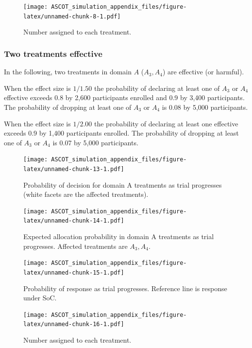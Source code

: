 \documentclass[
]{article}
\begin{document}
\begin{figure}
\centering
\texttt{[image: ASCOT\_simulation\_appendix\_files/figure-latex/unnamed-chunk-8-1.pdf]}
\caption{\label{fig:unnamed-chunk-8}Number assigned to each treatment.}
\end{figure}

\clearpage

\hypertarget{two-treatments-effective}{%
\subsubsection{Two treatments effective}\label{two-treatments-effective}}

In the following, two treatments in domain \(A\) (\(A_3, A_4\)) are effective (or harmful).

When the effect size is \(1/1.50\) the probability of declaring at least one of \(A_3\) or \(A_4\) effective exceeds 0.8 by 2,600 participants enrolled and 0.9 by 3,400 participants.
The probability of dropping at least one of \(A_3\) or \(A_4\) is 0.08 by 5,000 participants.

When the effect size is \(1/2.00\) the probability of declaring at least one effective exceeds 0.9 by 1,400 participants enrolled.
The probability of dropping at least one of \(A_3\) or \(A_4\) is 0.07 by 5,000 participants.

\begin{figure}
\centering
\texttt{[image: ASCOT\_simulation\_appendix\_files/figure-latex/unnamed-chunk-13-1.pdf]}
\caption{\label{fig:unnamed-chunk-13}Probability of decision for domain A treatments as trial progresses (white facets are the affected treatments).}
\end{figure}

\begin{figure}
\centering
\texttt{[image: ASCOT\_simulation\_appendix\_files/figure-latex/unnamed-chunk-14-1.pdf]}
\caption{\label{fig:unnamed-chunk-14}Expected allocation probability in domain A treatments as trial progresses. Affected treatments are \(A_3, A_4\).}
\end{figure}

\begin{figure}
\centering
\texttt{[image: ASCOT\_simulation\_appendix\_files/figure-latex/unnamed-chunk-15-1.pdf]}
\caption{\label{fig:unnamed-chunk-15}Probability of response as trial progresses. Reference line is response under SoC.}
\end{figure}

\begin{figure}
\centering
\texttt{[image: ASCOT\_simulation\_appendix\_files/figure-latex/unnamed-chunk-16-1.pdf]}
\caption{\label{fig:unnamed-chunk-16}Number assigned to each treatment.}
\end{figure}
\end{document}
